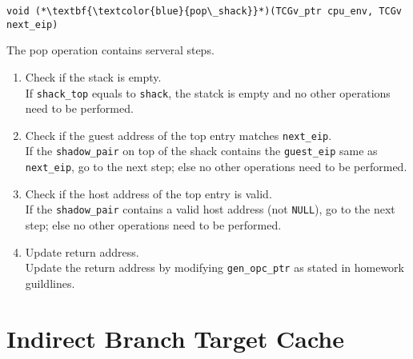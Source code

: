 \documentclass[12pt]{article}
\begin{document}
        \newpage
        
        \begin{lstlisting}[style=Function] 
            void (*\textbf{\textcolor{blue}{pop\_shack}}*)(TCGv_ptr cpu_env, TCGv next_eip)
        \end{lstlisting}
        The pop operation contains serveral steps.
        \begin{enumerate}
            \item Check if the stack is empty. \\
                If \verb|shack_top| equals to \verb|shack|, the statck is empty and no other operations need to be performed.

            \item Check if the guest address of the top entry matches \verb|next_eip|.  \\
                If the \verb|shadow_pair| on top of the shack contains the \verb|guest_eip| same as \verb|next_eip|,
                go to the next step; else no other operations need to be performed.

            \item Check if the host address of the top entry is valid. \\
                If the \verb|shadow_pair| contains a valid host address (not \verb|NULL|),
                go to the next step; else no other operations need to be performed.

            \item Update return address. \\
                Update the return address by modifying \verb|gen_opc_ptr| as stated in homework guildlines.
        \end{enumerate}


\section{Indirect Branch Target Cache}
\end{document}
